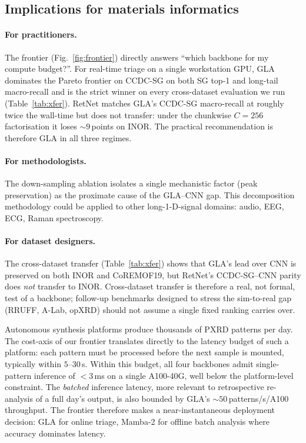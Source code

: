 \documentclass[final]{ws-ijwmip}
\begin{document}
\subsection{Implications for materials informatics}

\paragraph{For practitioners.} The frontier (Fig.~\ref{fig:frontier})
directly answers ``which backbone for my compute budget?''. For
real-time triage on a single workstation GPU, GLA dominates the
Pareto frontier on CCDC-SG on both SG top-1 and long-tail macro-recall
and is the strict winner on every cross-dataset evaluation we run
(Table~\ref{tab:xfer}). RetNet matches GLA's CCDC-SG macro-recall at
roughly twice the wall-time but does not transfer: under the chunkwise
$C\!=\!256$ factorisation it loses $\sim 9$\,points on INOR. The
practical recommendation is therefore GLA in all three regimes.

\paragraph{For methodologists.} The down-sampling ablation isolates a
single mechanistic factor (peak preservation) as the proximate cause
of the GLA--CNN gap. This decomposition methodology could be applied
to other long-1-D-signal domains: audio, EEG, ECG, Raman
spectroscopy.

\paragraph{For dataset designers.} The cross-dataset transfer
(Table~\ref{tab:xfer}) shows that GLA's lead over CNN is preserved on
both INOR and CoREMOF19, but RetNet's CCDC-SG--CNN parity does
\emph{not} transfer to INOR. Cross-dataset transfer is therefore a
real, not formal, test of a backbone; follow-up benchmarks designed
to stress the sim-to-real gap (RRUFF, A-Lab, opXRD) should not assume
a single fixed ranking carries over.

Autonomous synthesis platforms produce thousands of PXRD patterns per
day. The cost-axis of our frontier translates directly to the latency
budget of such a platform: each pattern must be processed before the
next sample is mounted, typically within $5$--$30$\,s. Within this
budget, all four backbones admit single-pattern inference of $<3$\,ms
on a single A100-40G, well below the platform-level constraint. The
\emph{batched} inference latency, more relevant to retrospective
re-analysis of a full day's output, is also bounded by GLA's
$\sim 50$\,patterns/s/A100 throughput. The frontier therefore makes a
near-instantaneous deployment decision: GLA for online triage,
Mamba-2 for offline batch analysis where accuracy dominates latency.
\end{document}
